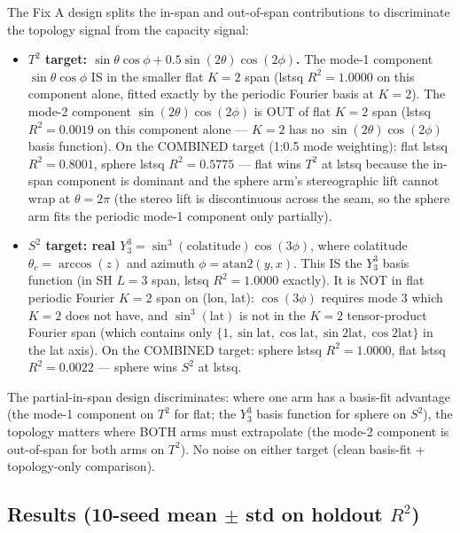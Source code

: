 \documentclass[11pt,a4paper]{article}
\theoremstyle{plain}
\theoremstyle{remark}
\theoremstyle{plain}
\begin{document}
The Fix A design splits the in-span and out-of-span contributions to discriminate the topology signal from the capacity signal:
\begin{itemize}
\item \textbf{$T^2$ target: $\sin\theta\cos\phi + 0.5\sin(2\theta)\cos(2\phi)$.} The mode-1 component $\sin\theta\cos\phi$ IS in the smaller flat $K{=}2$ span (lstsq $R^2 = 1.0000$ on this component alone, fitted exactly by the periodic Fourier basis at $K{=}2$). The mode-2 component $\sin(2\theta)\cos(2\phi)$ is OUT of flat $K{=}2$ span (lstsq $R^2 = 0.0019$ on this component alone --- $K{=}2$ has no $\sin(2\theta)\cos(2\phi)$ basis function). On the COMBINED target (1:0.5 mode weighting): flat lstsq $R^2 = 0.8001$, sphere lstsq $R^2 = 0.5775$ --- flat wins $T^2$ at lstsq because the in-span component is dominant and the sphere arm's stereographic lift cannot wrap at $\theta = 2\pi$ (the stereo lift is discontinuous across the seam, so the sphere arm fits the periodic mode-1 component only partially).
\item \textbf{$S^2$ target: real $Y_3^3 = \sin^3(\mathrm{colatitude})\cos(3\phi)$}, where colatitude $\theta_c = \arccos(z)$ and azimuth $\phi = \mathrm{atan2}(y, x)$. This IS the $Y_3^3$ basis function (in SH $L{=}3$ span, lstsq $R^2 = 1.0000$ exactly). It is NOT in flat periodic Fourier $K{=}2$ span on (lon, lat): $\cos(3\phi)$ requires mode 3 which $K{=}2$ does not have, and $\sin^3(\mathrm{lat})$ is not in the $K{=}2$ tensor-product Fourier span (which contains only $\{1, \sin\mathrm{lat}, \cos\mathrm{lat}, \sin 2\mathrm{lat}, \cos 2\mathrm{lat}\}$ in the lat axis). On the COMBINED target: sphere lstsq $R^2 = 1.0000$, flat lstsq $R^2 = 0.0022$ --- sphere wins $S^2$ at lstsq.
\end{itemize}

The partial-in-span design discriminates: where one arm has a basis-fit advantage (the mode-1 component on $T^2$ for flat; the $Y_3^3$ basis function for sphere on $S^2$), the topology matters where BOTH arms must extrapolate (the mode-2 component is out-of-span for both arms on $T^2$). No noise on either target (clean basis-fit + topology-only comparison).

\subsection{Results (10-seed mean $\pm$ std on holdout $R^2$)}
\end{document}
